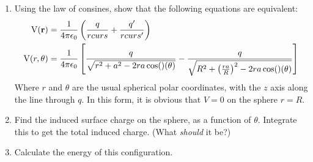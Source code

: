 \begin{hwkProblem}{3.8}{}

	\begin{enumerate}
		\item Using the law of consines, show that the following equations are equivalent:
			\begin{align}
				\func{V}[\vecb{r}] &= \frac{1}{4 \pi \epsilon_{0}} \left( \frac{q}{rcurs} + \frac{q'}{rcurs '} \right) \\
				\func{V}[r, \theta] &= \frac{1}{4 \pi \epsilon_{0}} \left[ \frac{q}{\sqrt{r^{2}+a^{2}-2ra\cos\left(\theta\right)}} - \frac{q}{\sqrt{R^{2}+{\left(\frac{ra}{R}\right)}^{2}-2ra\cos\left(\theta\right)}} \right]
			\end{align}
			Where \( r \) and \( \theta \) are the usual spherical polar coordinates, with the \( z \) axis along the line through \( q \). In this form, it is obvious that \( V = 0 \) on the sphere \( r = R \).
		\item Find the induced surface charge on the sphere, as a function of \( \theta \). Integrate this to get the total induced charge. (What \textit{should} it be?)
		\item Calculate the energy of this configuration.
	\end{enumerate}

	\hwkSol{}

\end{hwkProblem}
